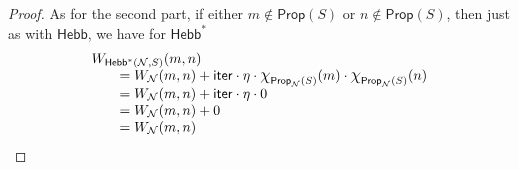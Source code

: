 \documentclass[letterpaper]{article}
\theoremstyle{definition}
\newcommand*{\bigchi}{\mbox{\Large$\chi$}}%
\newcommand{\numiterations}{\mathsf{iter}}
\newcommand{\Net}{\mathcal{N}}
\newcommand{\Prop}{\textsf{Prop}}
\newcommand{\HebbNoArgs}{\textsf{Hebb}}
\newcommand{\Hebbstar}[2]{\textsf{Hebb}^*(#1, #2)}
\newcommand{\HebbstarNoArgs}{\textsf{Hebb}^*}
\begin{document}
\begin{proof}
    As for the second part, if either $m \not \in \Prop(S)$ or $n \not \in \Prop(S)$, then just as with $\HebbNoArgs$, we have for $\HebbstarNoArgs$
    \[\arraycolsep=1.4pt
    \begin{array}{l}
        W_{\Hebbstar{\Net}{S}}(m, n)\\
        \quad \quad = W_\Net(m, n) + \numiterations \cdot \eta \cdot \bigchi_{\Prop_\Net(S)}(m) \cdot \bigchi_{\Prop_\Net(S)}(n)\\

        \quad \quad = W_\Net(m, n) + \numiterations \cdot \eta \cdot 0\\
        \quad \quad = W_\Net(m, n) + 0\\
        \quad \quad = W_\Net(m, n)
    \end{array}
    \]
\end{proof}
\end{document}
